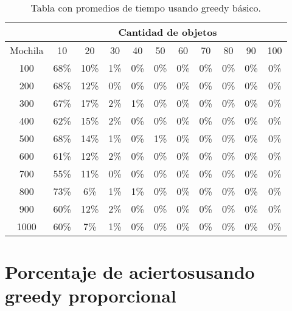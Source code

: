 \documentclass[a4paper]{article}
\begin{document}
\begin{table}[H]
\centering
\relax
\resizebox{\textwidth}{!} {%
\begin{tabular}{|c|c|c|c|c|c|c|c|c|c|c|}
\cline{2-11}
 \multicolumn{1}{c}{} & \multicolumn{10}{|c|}{\textbf{Cantidad de objetos}} \\
\hline
Mochila & 10 & 20 & 30 & 40 & 50 & 60 & 70 & 80 & 90 & 100 \\
\hline
\hline
100 & 68\% & 10\% & 1\% & 0\% & 0\% & 0\% & 0\% & 0\% & 0\% & 0\% \\
\hline
\hline
200 & 68\% & 12\% & 0\% & 0\% & 0\% & 0\% & 0\% & 0\% & 0\% & 0\% \\
\hline
\hline
300 & 67\% & 17\% & 2\% & 1\% & 0\% & 0\% & 0\% & 0\% & 0\% & 0\% \\
\hline
\hline
400 & 62\% & 15\% & 2\% & 0\% & 0\% & 0\% & 0\% & 0\% & 0\% & 0\% \\
\hline
\hline
500 & 68\% & 14\% & 1\% & 0\% & 1\% & 0\% & 0\% & 0\% & 0\% & 0\% \\
\hline
\hline
600 & 61\% & 12\% & 2\% & 0\% & 0\% & 0\% & 0\% & 0\% & 0\% & 0\% \\
\hline
\hline
700 & 55\% & 11\% & 0\% & 0\% & 0\% & 0\% & 0\% & 0\% & 0\% & 0\% \\
\hline
\hline
800 & 73\% & 6\% & 1\% & 1\% & 0\% & 0\% & 0\% & 0\% & 0\% & 0\% \\
\hline
\hline
900 & 60\% & 12\% & 2\% & 0\% & 0\% & 0\% & 0\% & 0\% & 0\% & 0\% \\
\hline
\hline
1000 & 60\% & 7\% & 1\% & 0\% & 0\% & 0\% & 0\% & 0\% & 0\% & 0\% \\
\hline
\end{tabular}%
}
\caption{Tabla con promedios de tiempo usando greedy básico.}
\end{table}
\section{Porcentaje de aciertosusando greedy proporcional}
\end{document}
